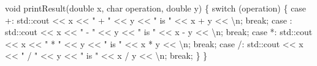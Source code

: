 \documentclass[
  letterpaper,
  DIV=11,
  numbers=noendperiod]{scrreprt}
\newenvironment{Shaded}{\begin{snugshade}}{\end{snugshade}}
\newcommand{\ControlFlowTok}[1]{\textcolor[rgb]{0.00,0.23,0.31}{#1}}
\newcommand{\ErrorTok}[1]{\textcolor[rgb]{0.68,0.00,0.00}{#1}}
\newcommand{\FunctionTok}[1]{\textcolor[rgb]{0.28,0.35,0.67}{#1}}
\newcommand{\NormalTok}[1]{\textcolor[rgb]{0.00,0.23,0.31}{#1}}
\newcommand{\SpecialCharTok}[1]{\textcolor[rgb]{0.37,0.37,0.37}{#1}}
\newcommand{\StringTok}[1]{\textcolor[rgb]{0.13,0.47,0.30}{#1}}
\begin{document}
\begin{Shaded}
\begin{Highlighting}[]
\NormalTok{void }\FunctionTok{printResult}\NormalTok{(double x, char operation, double y)}
\NormalTok{\{}
    \ControlFlowTok{switch}\NormalTok{ (operation)}
\NormalTok{    \{}
\NormalTok{    case }\StringTok{\textquotesingle{}+\textquotesingle{}}\SpecialCharTok{:}
\NormalTok{        std}\SpecialCharTok{::}\NormalTok{cout }\SpecialCharTok{\textless{}}\ErrorTok{\textless{}}\NormalTok{ x }\SpecialCharTok{\textless{}}\ErrorTok{\textless{}} \StringTok{" + "} \SpecialCharTok{\textless{}}\ErrorTok{\textless{}}\NormalTok{ y }\SpecialCharTok{\textless{}}\ErrorTok{\textless{}} \StringTok{" is "} \SpecialCharTok{\textless{}}\ErrorTok{\textless{}}\NormalTok{ x }\SpecialCharTok{+}\NormalTok{ y }\SpecialCharTok{\textless{}}\ErrorTok{\textless{}} \StringTok{\textquotesingle{}}\SpecialCharTok{\textbackslash{}n}\StringTok{\textquotesingle{}}\NormalTok{;}
        \ControlFlowTok{break}\NormalTok{;}
\NormalTok{    case }\StringTok{\textquotesingle{}{-}\textquotesingle{}}\SpecialCharTok{:}
\NormalTok{        std}\SpecialCharTok{::}\NormalTok{cout }\SpecialCharTok{\textless{}}\ErrorTok{\textless{}}\NormalTok{ x }\SpecialCharTok{\textless{}}\ErrorTok{\textless{}} \StringTok{" {-} "} \SpecialCharTok{\textless{}}\ErrorTok{\textless{}}\NormalTok{ y }\SpecialCharTok{\textless{}}\ErrorTok{\textless{}} \StringTok{" is "} \SpecialCharTok{\textless{}}\ErrorTok{\textless{}}\NormalTok{ x }\SpecialCharTok{{-}}\NormalTok{ y }\SpecialCharTok{\textless{}}\ErrorTok{\textless{}} \StringTok{\textquotesingle{}}\SpecialCharTok{\textbackslash{}n}\StringTok{\textquotesingle{}}\NormalTok{;}
        \ControlFlowTok{break}\NormalTok{;}
\NormalTok{    case }\StringTok{\textquotesingle{}*\textquotesingle{}}\SpecialCharTok{:}
\NormalTok{        std}\SpecialCharTok{::}\NormalTok{cout }\SpecialCharTok{\textless{}}\ErrorTok{\textless{}}\NormalTok{ x }\SpecialCharTok{\textless{}}\ErrorTok{\textless{}} \StringTok{" * "} \SpecialCharTok{\textless{}}\ErrorTok{\textless{}}\NormalTok{ y }\SpecialCharTok{\textless{}}\ErrorTok{\textless{}} \StringTok{" is "} \SpecialCharTok{\textless{}}\ErrorTok{\textless{}}\NormalTok{ x }\SpecialCharTok{*}\NormalTok{ y }\SpecialCharTok{\textless{}}\ErrorTok{\textless{}} \StringTok{\textquotesingle{}}\SpecialCharTok{\textbackslash{}n}\StringTok{\textquotesingle{}}\NormalTok{;}
        \ControlFlowTok{break}\NormalTok{;}
\NormalTok{    case }\StringTok{\textquotesingle{}/\textquotesingle{}}\SpecialCharTok{:}
\NormalTok{        std}\SpecialCharTok{::}\NormalTok{cout }\SpecialCharTok{\textless{}}\ErrorTok{\textless{}}\NormalTok{ x }\SpecialCharTok{\textless{}}\ErrorTok{\textless{}} \StringTok{" / "} \SpecialCharTok{\textless{}}\ErrorTok{\textless{}}\NormalTok{ y }\SpecialCharTok{\textless{}}\ErrorTok{\textless{}} \StringTok{" is "} \SpecialCharTok{\textless{}}\ErrorTok{\textless{}}\NormalTok{ x }\SpecialCharTok{/}\NormalTok{ y }\SpecialCharTok{\textless{}}\ErrorTok{\textless{}} \StringTok{\textquotesingle{}}\SpecialCharTok{\textbackslash{}n}\StringTok{\textquotesingle{}}\NormalTok{;}
        \ControlFlowTok{break}\NormalTok{;}
\NormalTok{    \}}
\NormalTok{\}}


\end{Highlighting}
\end{Shaded}
\end{document}
